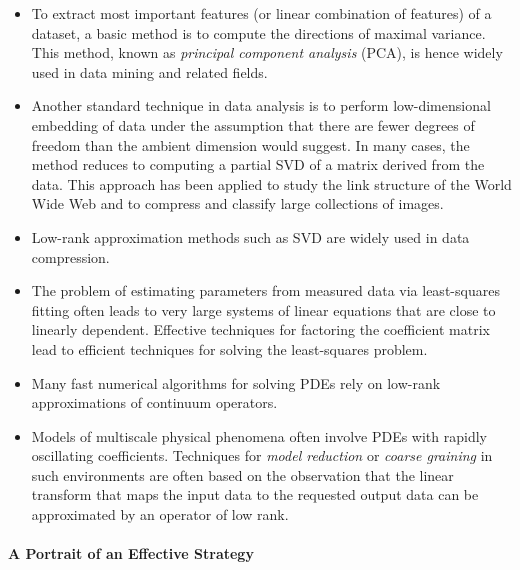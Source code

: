 \documentclass[12pt]{article}
\begin{document}
\begin{itemize}
\item To extract most important features (or linear combination of features) of a dataset, a basic method is to compute the directions of maximal variance. This method, known as \emph{principal component analysis} (PCA), is hence widely used in data mining and related fields.


\item   Another standard technique in data analysis is to perform
low-dimen\-sional embedding of data under the assumption that there
are fewer degrees of freedom than the ambient dimension would suggest.
In many cases, the method reduces to computing a partial SVD of a matrix
derived from the data.  %
This approach has been applied to study the link structure of the
World Wide Web and to compress and classify large
collections of images.

\item Low-rank approximation methods such as SVD are widely used in data compression.

\item The problem of estimating parameters from measured data via
least-squares fitting often leads to very large systems of linear
equations that are close to linearly dependent. Effective techniques
for factoring the coefficient matrix lead to efficient techniques
for solving the least-squares problem.

\item Many fast numerical algorithms for solving PDEs rely on low-rank approximations of continuum operators.

\item Models of multiscale physical phenomena often involve PDEs with rapidly
oscillating coefficients. Techniques for  \emph{model reduction}
or \emph{coarse graining} in such environments are often based %
on the observation that the linear transform that maps the input data to the requested output
data %
can be approximated by an operator of low rank.
\end{itemize}

\paragraph{A Portrait of an Effective Strategy}
\end{document}
